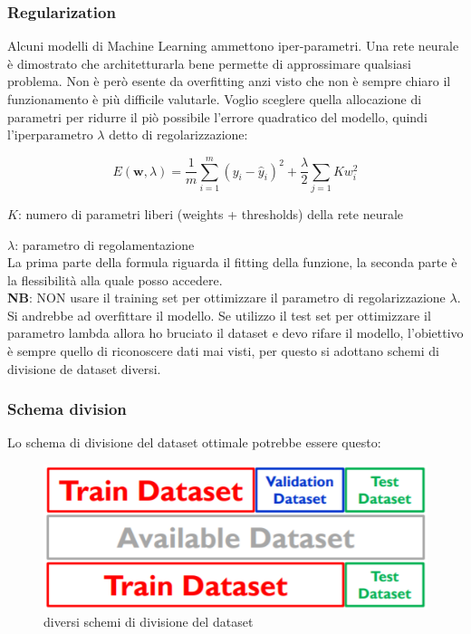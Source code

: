 \subsubsection{Regularization}
Alcuni modelli di Machine Learning ammettono iper-parametri. Una rete neurale \`e dimostrato che architetturarla bene permette  di approssimare qualsiasi problema. Non \`e per\`o esente da overfitting anzi visto che non \`e sempre chiaro il funzionamento \`e pi\`u difficile valutarle. Voglio sceglere quella allocazione di parametri per ridurre il pi\`o possibile l'errore quadratico del modello, quindi l'iperparametro $\lambda$ detto di regolarizzazione:

\[E(\textbf{w},\lambda) = \frac{1}{m} \sum_{i=1}^{m}(y_i - \hat{y}_i)^2 + \frac{\lambda}{2} \sum_{j=1}{K} w_i^2 \]

$K$: numero di parametri liberi (weights + thresholds) della rete neurale

$\lambda$: parametro di regolamentazione\\
La prima parte della formula riguarda il fitting della funzione, la seconda parte \`e la flessibilit\`a alla quale posso accedere.\\

\textbf{NB}: NON usare il training set per ottimizzare il parametro di regolarizzazione $\lambda$. Si andrebbe ad overfittare il modello. Se utilizzo il test set per ottimizzare il parametro lambda allora ho bruciato il dataset e devo rifare il modello, l'obiettivo \`e sempre quello di riconoscere dati mai visti, per questo si adottano schemi di divisione de dataset diversi. 

\subsubsection{Schema division}
Lo schema di divisione del dataset ottimale potrebbe essere questo:
\begin{figure}[H]
	\centering
	\includegraphics[height=0.3 \linewidth]{classification/pict/schema_dataset.png}
	\caption{diversi schemi di divisione del dataset}
\end{figure}

